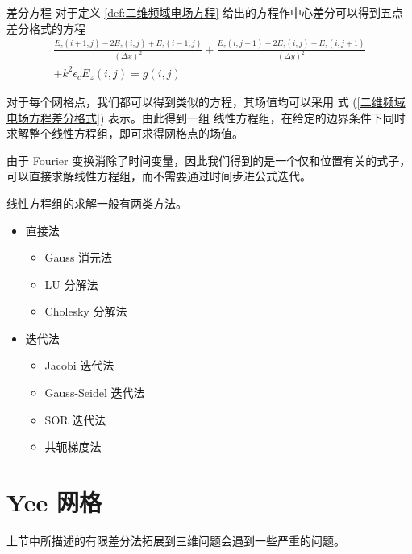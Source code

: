 \begin{theorem}{差分方程}
    对于定义 \ref{def:二维频域电场方程} 给出的方程作中心差分可以得到五点差分格式的方程
    \begin{equation}
        \begin{gathered}
            \frac{E_z(i+1,j)-2E_z(i,j)+E_z(i-1,j)}{(\Delta x)^2}
            +\frac{E_z(i,j-1)-2E_z(i,j)+E_z(i,j+1)}{(\Delta y)^2}\\
            +k^2\epsilon_c E_z(i,j)
            =g(i,j)
        \end{gathered}
        \label{二维频域电场方程差分格式}
    \end{equation}
\end{theorem}

\par 对于每个网格点，我们都可以得到类似的方程，其场值均可以采用
式 (\ref{二维频域电场方程差分格式}) 表示。由此得到一组
线性方程组，在给定的边界条件下同时求解整个线性方程组，即可求得网格点的场值。

\begin{note}
    由于 Fourier 变换消除了时间变量，因此我们得到的是一个仅和位置有关的式子，
    可以直接求解线性方程组，而不需要通过时间步进公式迭代。
\end{note}

\par 线性方程组的求解一般有两类方法。
\begin{itemize}
    \item 直接法
    \begin{itemize}
        \item Gauss 消元法
        \item LU 分解法
        \item Cholesky 分解法
    \end{itemize}
    \item 迭代法
    \begin{itemize}
        \item Jacobi 迭代法
        \item Gauss-Seidel 迭代法
        \item SOR 迭代法
        \item 共轭梯度法
    \end{itemize}
\end{itemize}

\section{Yee 网格}

\par 上节中所描述的有限差分法拓展到三维问题会遇到一些严重的问题。

